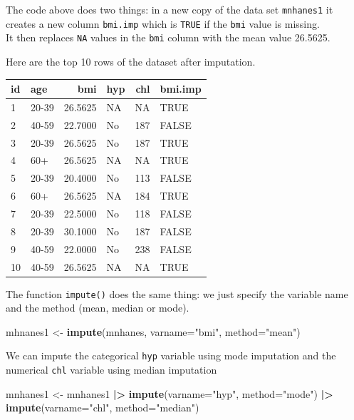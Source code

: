 \documentclass[
]{book}
\newenvironment{Shaded}{\begin{snugshade}}{\end{snugshade}}
\newcommand{\AttributeTok}[1]{\textcolor[rgb]{0.13,0.29,0.53}{#1}}
\newcommand{\FunctionTok}[1]{\textcolor[rgb]{0.13,0.29,0.53}{\textbf{#1}}}
\newcommand{\NormalTok}[1]{#1}
\newcommand{\OtherTok}[1]{\textcolor[rgb]{0.56,0.35,0.01}{#1}}
\newcommand{\SpecialCharTok}[1]{\textcolor[rgb]{0.81,0.36,0.00}{\textbf{#1}}}
\newcommand{\StringTok}[1]{\textcolor[rgb]{0.31,0.60,0.02}{#1}}
\begin{document}
The code above does two things: in a new copy of the data set \texttt{mnhanes1}
it creates a new column \texttt{bmi.imp} which is \texttt{TRUE} if the \texttt{bmi} value is missing.\\
It then replaces \texttt{NA} values in the \texttt{bmi} column with the mean value
26.5625.

Here are the top 10 rows of the dataset after imputation.

\begin{table}
\centering
\begin{tabular}[t]{l|l|r|l|r|l}
\hline
id & age & bmi & hyp & chl & bmi.imp\\
\hline
1 & 20-39 & 26.5625 & NA & NA & TRUE\\
\hline
2 & 40-59 & 22.7000 & No & 187 & FALSE\\
\hline
3 & 20-39 & 26.5625 & No & 187 & TRUE\\
\hline
4 & 60+ & 26.5625 & NA & NA & TRUE\\
\hline
5 & 20-39 & 20.4000 & No & 113 & FALSE\\
\hline
6 & 60+ & 26.5625 & NA & 184 & TRUE\\
\hline
7 & 20-39 & 22.5000 & No & 118 & FALSE\\
\hline
8 & 20-39 & 30.1000 & No & 187 & FALSE\\
\hline
9 & 40-59 & 22.0000 & No & 238 & FALSE\\
\hline
10 & 40-59 & 26.5625 & NA & NA & TRUE\\
\hline
\end{tabular}
\end{table}

The function \texttt{impute()} does the same thing: we just specify the variable name
and the method (mean, median or mode).

\begin{Shaded}
\begin{Highlighting}[]
\NormalTok{mhnanes1 }\OtherTok{\textless{}{-}} \FunctionTok{impute}\NormalTok{(mnhanes, }\AttributeTok{varname=}\StringTok{"bmi"}\NormalTok{, }\AttributeTok{method=}\StringTok{"mean"}\NormalTok{)}
\end{Highlighting}
\end{Shaded}

We can impute the categorical \texttt{hyp} variable using mode imputation
and the numerical \texttt{chl} variable using median imputation

\begin{Shaded}
\begin{Highlighting}[]
\NormalTok{mnhanes1 }\OtherTok{\textless{}{-}}\NormalTok{ mnhanes1 }\SpecialCharTok{|\textgreater{}}
  \FunctionTok{impute}\NormalTok{(}\AttributeTok{varname=}\StringTok{"hyp"}\NormalTok{, }\AttributeTok{method=}\StringTok{"mode"}\NormalTok{) }\SpecialCharTok{|\textgreater{}}
  \FunctionTok{impute}\NormalTok{(}\AttributeTok{varname=}\StringTok{"chl"}\NormalTok{, }\AttributeTok{method=}\StringTok{"median"}\NormalTok{) }
\end{Highlighting}
\end{Shaded}
\end{document}
